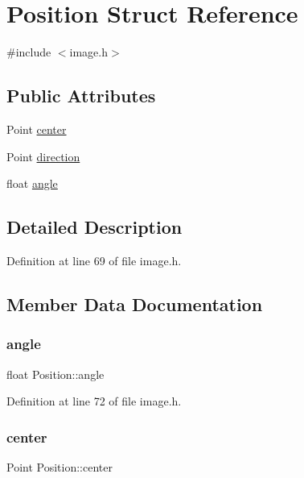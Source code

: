 \hypertarget{struct_position}{}\section{Position Struct Reference}
\label{struct_position}


{\ttfamily \#include $<$image.\+h$>$}

\subsection*{Public Attributes}
\begin{DoxyCompactItemize}
\item 
Point \hyperlink{struct_position_aa56444be37071311cfa11aae3e2c2f64}{center}
\item 
Point \hyperlink{struct_position_a780d124971951424c0c63f6d81bb4d92}{direction}
\item 
float \hyperlink{struct_position_a733540df6c0f832676dc0846b34bb1e2}{angle}
\end{DoxyCompactItemize}


\subsection{Detailed Description}


Definition at line 69 of file image.\+h.



\subsection{Member Data Documentation}
\mbox{\label{struct_position_a733540df6c0f832676dc0846b34bb1e2}} 
\subsubsection{\texorpdfstring{angle}{angle}}
{\footnotesize\ttfamily float Position\+::angle}



Definition at line 72 of file image.\+h.

\mbox{\label{struct_position_aa56444be37071311cfa11aae3e2c2f64}} 
\subsubsection{\texorpdfstring{center}{center}}
{\footnotesize\ttfamily Point Position\+::center}



